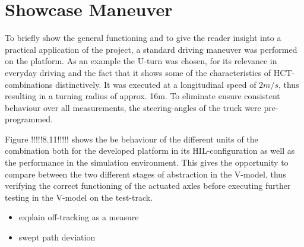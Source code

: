 \documentclass[root.tex]{subfiles}
\begin{document}
	
	{\pagestyle{empty}}
	\section{Showcase Maneuver}
	\label{chap:Showcase_Maneuver}
	To briefly show the general functioning and to give the reader insight into a practical application of the project, a standard driving maneuver was performed on the platform. As an example the U-turn was chosen, for its relevance in everyday driving and the fact that it shows some of the characteristics of \gls{HCT}-combinations distinctively. It was executed at a longitudinal speed of $2m/s$, thus resulting in a turning radius of approx. 16m. To eliminate ensure consistent behaviour over all measurements, the steering-angles of the truck were pre-programmed.
	
	Figure !!!!!8.11!!!!! shows the be behaviour of the different units of the combination both for the developed platform in its \gls{HIL}-configuration as well as the performance in the simulation environment. This gives the opportunity to compare between the two different stages of abstraction in the V-model, thus verifying the correct functioning of the actuated axles before executing further testing in the V-model on the test-track. 
	
	\begin{itemize}
		\item explain off-tracking as a measure 
		\item swept path deviation	
	\end{itemize}
	
\end{document}

